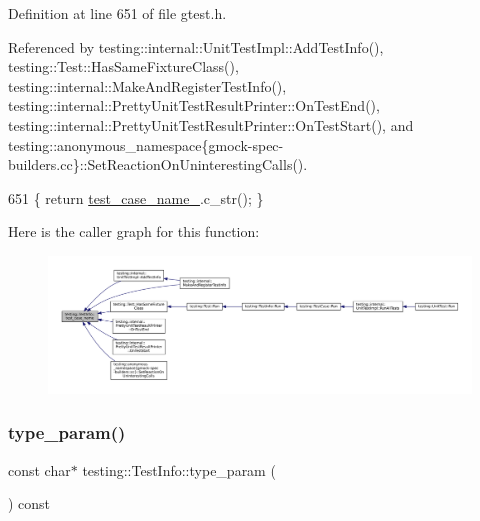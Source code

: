 Definition at line 651 of file gtest.\+h.



Referenced by testing\+::internal\+::\+Unit\+Test\+Impl\+::\+Add\+Test\+Info(), testing\+::\+Test\+::\+Has\+Same\+Fixture\+Class(), testing\+::internal\+::\+Make\+And\+Register\+Test\+Info(), testing\+::internal\+::\+Pretty\+Unit\+Test\+Result\+Printer\+::\+On\+Test\+End(), testing\+::internal\+::\+Pretty\+Unit\+Test\+Result\+Printer\+::\+On\+Test\+Start(), and testing\+::anonymous\+\_\+namespace\{gmock-\/spec-\/builders.\+cc\}\+::\+Set\+Reaction\+On\+Uninteresting\+Calls().


\begin{DoxyCode}
651 \{ \textcolor{keywordflow}{return} \hyperlink{classtesting_1_1TestInfo_a3dcf626bbfc3756103be329c05377a5f}{test\_case\_name\_}.c\_str(); \}
\end{DoxyCode}
Here is the caller graph for this function\+:
\nopagebreak
\begin{figure}[H]
\begin{center}
\leavevmode
\includegraphics[width=350pt]{classtesting_1_1TestInfo_a036a20710c8c2252889544daba9a8ff9_icgraph}
\end{center}
\end{figure}
\mbox{\label{classtesting_1_1TestInfo_a7759bc57f4350ad406cbbb0b3bcea320}} 
\subsubsection{\texorpdfstring{type\+\_\+param()}{type\_param()}}
{\footnotesize\ttfamily const char$\ast$ testing\+::\+Test\+Info\+::type\+\_\+param (\begin{DoxyParamCaption}{ }\end{DoxyParamCaption}) const\hspace{0.3cm}{\ttfamily [inline]}}



